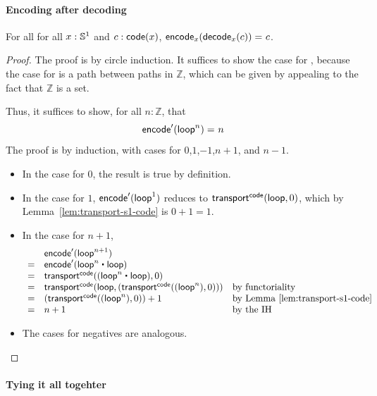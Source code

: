 \paragraph{Encoding after decoding}

\begin{lem} \label{lem:s1-encode-decode} For all 
for all $x: \mathbb{S} ^1$ and $c : \mathsf{code}(x)$, $\mathsf{encode}_x({{\mathsf{decode}_x(c)}}) =_{} c$.  
\end{lem}

\begin{proof}
The proof is by circle induction.  It suffices to show the case for
\base, because the case for \lloop is a path between paths in
$\mathbb{Z}$, which can be given by appealing to the fact that $\mathbb{Z}$ is a set.  

Thus, it suffices to show, for all $n : \mathbb{Z}$, that
\[
\mathsf{encode}'(\mathsf{loop}^n) =_{} n
\]
The proof is by induction, with cases for $0$,$1$,$-1$,$n+1$, and
$n-1$.  

\begin{itemize}

\item In the case for $0$, the result is true by definition.

\item In the case for $1$, ${\mathsf{encode}'(\mathsf{loop}^1)}$ reduces to 
$\mathsf{transport}^{\mathsf{code}}(\mathsf{loop},0)$, which by
Lemma~\ref{lem:transport-s1-code} is $0 + 1 = 1$.  

\item In the case for $n+1$, 
\[
\begin{array}{lll}
  & {\encode'(\lloop^{n+1})}  \\
= & {\encode'(\lloop^{n} \ct \lloop)} & \\
= & \transfib{\code}{(\lloop^{n} \ct \lloop)}{0} & \\
= & \transfib{\code}{\lloop}{(\transfib{\code}{(\lloop^n)}{0})} & \text{by functoriality}\\
= & {(\transfib{\code}{(\lloop^n)}{0})} + 1 & \text{by Lemma~\ref{lem:transport-s1-code}}\\
= & n + 1 & \text{by the IH} \\
\end{array}
\]

\item The cases for negatives are analogous.  
\end{itemize}
\end{proof}

\paragraph{Tying it all togehter}

